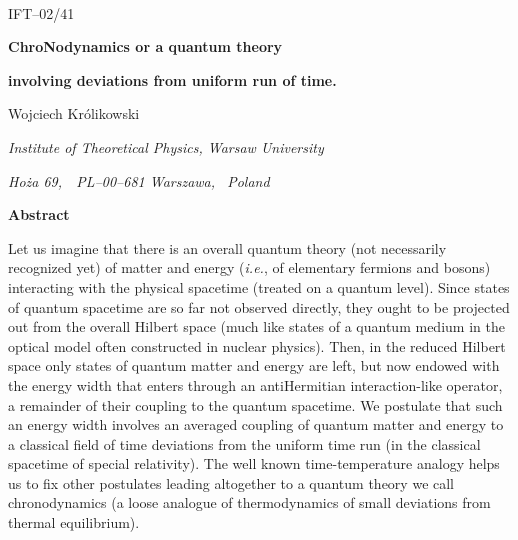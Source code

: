 \documentclass[a4paper,12pt]{article}
\begin{document}
\baselineskip 0.75cm
\topmargin -0.6in
\oddsidemargin -0.1in

\let\ni=\noindent

\renewcommand{\thefootnote}{\fnsymbol{footnote}}

\newcommand{\CKM}{Cabibbo--Kobayashi--Maskawa }

\newcommand{\SM}{Standard Model }

\pagestyle {plain}

\setcounter{page}{1}

\pagestyle{empty}

~~~

\begin{flushright}
IFT--02/41
\end{flushright}

{\large\centerline{\bf ChroNodynamics or a quantum theory}}
{\large\centerline{\bf involving deviations from uniform run of time.}}

\vspace{0.3cm}

{\centerline {\sc Wojciech Kr\'{o}likowski}}

\vspace{0.2cm}

{\centerline {\it Institute of Theoretical Physics, Warsaw University}}

{\centerline {\it Ho\.{z}a 69,~~PL--00--681 Warszawa, ~Poland}}

\vspace{0.3cm}

{\centerline{\bf Abstract}}

\vspace{0.2cm}

Let us imagine that there is an overall quantum theory  (not necessarily recognized yet) of matter and energy ({\it i.e.}, of elementary fermions and bosons) interacting with the physical spacetime (treated on a quantum level). Since states of quantum spacetime are so far not observed directly, they ought to be projected out from the overall Hilbert space (much like states of a quantum medium in the optical model often constructed in nuclear physics). Then, in the reduced Hilbert space only states of quantum matter and energy are left, but now endowed with the energy width that enters through an antiHermitian interaction-like operator, a remainder of their coupling to the quantum spacetime. We postulate that such an energy width involves an averaged coupling of quantum matter and energy to a classical field of time deviations from the uniform time run (in the classical spacetime of special relativity). The well known time-temperature analogy helps us to fix other postulates leading altogether to a quantum theory we call chronodynamics (a loose analogue of thermodynamics of small deviations from thermal equilibrium).
\end{document}
